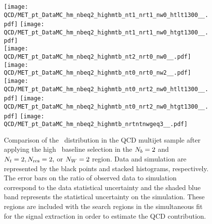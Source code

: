 \begin{figure}[!h]
	\begin{center}
  \texttt{[image: QCD/MET\_pt\_DataMC\_hm\_nbeq2\_highmtb\_nt1\_nrt1\_nw0\_htlt1300\_\_.pdf]}
  \texttt{[image: QCD/MET\_pt\_DataMC\_hm\_nbeq2\_highmtb\_nt1\_nrt1\_nw0\_htgt1300\_\_.pdf]} \\
  \texttt{[image: QCD/MET\_pt\_DataMC\_hm\_nbeq2\_highmtb\_nt2\_nrt0\_nw0\_\_.pdf]} 
  \texttt{[image: QCD/MET\_pt\_DataMC\_hm\_nbeq2\_highmtb\_nt0\_nrt0\_nw2\_\_.pdf]} \\
  \texttt{[image: QCD/MET\_pt\_DataMC\_hm\_nbeq2\_highmtb\_nt0\_nrt2\_nw0\_htlt1300\_\_.pdf]}  
  \texttt{[image: QCD/MET\_pt\_DataMC\_hm\_nbeq2\_highmtb\_nt0\_nrt2\_nw0\_htgt1300\_\_.pdf]}
  \texttt{[image: QCD/MET\_pt\_DataMC\_hm\_nbeq2\_highmtb\_nrtntnwgeq3\_\_.pdf]} \\
	\end{center}
	\caption[QCD Multijet HM Control Region $\nb=2$ with 2 Heavy Objects]{Comparison of the \met~distribution in the QCD multijet sample after applying the high \dm~baseline selection in the $\nb=2$ and $N_{t}=2, N_{\text{res}}=2,$ or $N_{W}=2$ region. Data and simulation are represented by the black points and stacked histograms, respectively. The error bars on the ratio of observed data to simulation correspond to the data statistical uncertainty and the shaded blue band represents the statistical uncertainty on the simulation. These regions are included with the search regions in the simultaneous fit for the signal extraction in order to estimate the QCD contribution.
	 }
	\label{fig:qcd-cr-datavsmc-hm-nb2-2}
\end{figure}

